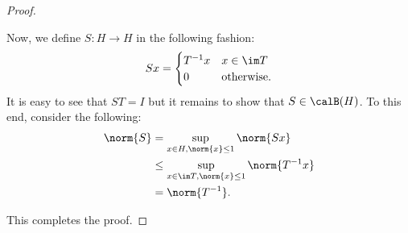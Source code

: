 \begin{proof}
\begin{description}
		Now, we define $S: H \to H$ in the following fashion:
		\begin{equation*}
		    Sx=
		    \begin{cases}
			T^{-1}x & x\in \im T \\
			0 & \text{otherwise.}
		    \end{cases}
		\end{equation*}
		It is easy to see that $ST=I$ but it remains to show that $S\in \calB (H)$. To this end, consider the following:
		\begin{align*}
		    \norm{S} &= \sup_{x\in H,\norm{x}\le 1} \norm{Sx} \\
		    &\le \sup_{x\in \im T, \norm{x} \le 1} \norm{T^{-1}x} \\
		    &= \norm{T^{-1}}.
		\end{align*}
	\end{description}
	This completes the proof.
   \end{proof}
